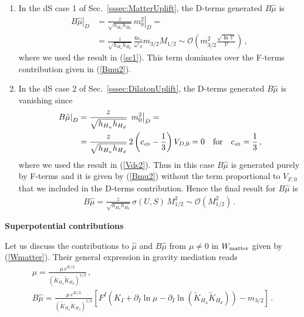 \documentclass[12pt,a4paper]{book}
\def\nn{\nonumber}
\def\nn{\nonumber}
\def\dS{{\scriptscriptstyle \rm dS}}
\newcommand{\mc}{\mathcal}
\begin{document}
\begin{enumerate}
\item In the dS case 1 of Sec.~\ref{sssec:MatterUplift}, the D-terms generated $B\hat\mu$ is
\begin{align}
\left.B\hat\mu\right|_D &= \frac{z}{\sqrt{h_{H_u} h_{H_d}}}\,\left.m_0^2\right|_D = \nn \\
&= \frac{z}{\sqrt{h_{H_u} h_{H_d}}}\,\frac{6\epsilon_s}{\omega'_S}m_{3/2}M_{1/2}\sim  \mc{O}\left(m_{3/2}^2\frac{\sqrt{\ln\mathcal{V}}}{\mathcal{V}}\right)\,,
\label{bmu2dS1}
\end{align}
where we used the result in (\ref{sc1}). This term dominates over the F-terms contribution given in (\ref{Bmu2}).

\item In the dS case 2 of Sec.~\ref{sssec:DilatonUplift}, the D-terms generated $B\hat\mu$ is vanishing since
\begin{align}
\left.B\hat\mu\right|_D &= \frac{z}{\sqrt{h_{H_u} h_{H_d}}}\,\left.m_0^2\right|_D = \nn \\
&= \frac{z}{\sqrt{h_{H_u} h_{H_d}}}\,2\left(c_\dS-\frac 13\right)V_{D,0}=0 \quad\text{for}\quad c_\dS=\frac 13\,,
\label{bmu2dS2}
\end{align}
where we used the result in (\ref{Vds2}). Thus in this case $B\hat\mu$ is generated purely by F-terms and it is given by (\ref{Bmu2}) without the term proportional to $V_{F,0}$ that we included in the D-terms contribution. Hence the final result for $B\hat\mu$ is
\begin{align}
B\hat\mu = \frac{z}{\sqrt{h_{H_u} h_{H_d}}}\,\sigma(U,S) \,M_{1/2}^2\sim\mc{O}\left(M_{1/2}^2\right)\,.
\label{Bmu22}
\end{align}
\end{enumerate}


\item \textbf{Superpotential contributions}

Let us discuss the contributions to $\hat\mu$ and $B\hat\mu$ from $\mu\neq 0$ in $W_{\rm matter}$ given by (\ref{Wmatter}). Their general expression in gravity mediation reads~\cite{Brignole:1993dj}
\begin{align}
\label{muW}
&\hat{\mu} = \frac{\mu\,e^{K/2}}{\left(\tilde{K}_{H_u} \tilde{K}_{H_d}\right)^{1/2}}\,,& \\
\label{BmuW}
&B\hat{\mu} = \frac{\mu\,e^{K/2}}{\left(\tilde{K}_{H_u} \tilde{K}_{H_d}\right)^{1/2}} \left[F^I \left(K_I + \partial_I \ln\mu - \partial_I \ln\left(\tilde{K}_{H_u} \tilde{K}_{H_d}\right)\right) - m_{3/2}\right]\,.&
\end{align}
\end{document}
